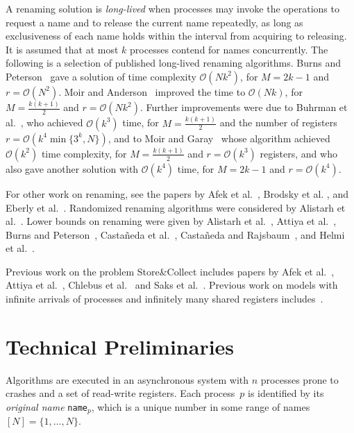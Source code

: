 \documentclass[11pt]{article}
\newcommand{\cO}{\mathcal{O}}
\begin{document}
A  renaming solution is \emph{long-lived} when processes may invoke the operations to request a name and to release the current name repeatedly, as long as exclusiveness of each name holds within the interval from acquiring to releasing.
It is assumed that at most $k$ processes contend for names concurrently.
The following is a selection of published long-lived renaming algorithms.
Burns and Peterson~\cite{BurnsP89} gave a solution of time complexity  $\cO(Nk^2)$, for $M=2k-1$ and $r=\cO(N^2)$.
Moir and Anderson~\cite{MoirA95}  improved the time to $\cO(Nk)$, for $M=\frac{k(k+1)}{2}$ and $r=\cO(Nk^2)$.
Further improvements were due to Buhrman et al.~\cite{BuhrmanGHM95}, who achieved $\cO(k^3)$ time, for $M=\frac{k(k+1)}{2}$ and the  number of registers $r=\cO(k^4\min\{3^k,N\})$, and to Moir and Garay~\cite{MoirG96} whose algorithm achieved $\cO(k^2)$ time complexity, for $M=\frac{k(k+1)}{2}$ and $r=\cO(k^3)$ registers, and who also gave another solution with $\cO(k^4)$ time, for $M=2k-1$ and $r=\cO(k^4)$.	

For other work on renaming, see the papers by Afek et al.~\cite{AfekAFST99,AfekBT00,AfekST02}, Brodsky et al. \cite{BrodskyEW06}, and Eberly et al.~\cite{EberlyHW98}.
Randomized renaming algorithms were considered by Alistarh et al.~\cite{AlistarhACGZ11, AlistarhAGW13, AlistarhAGGG10}.
Lower bounds on renaming were given by Alistarh et al.~\cite{AlistarhACGG14}, Attiya et al.~\cite{AttiyaCHP19,AttiyaP16,AttiyaR02}, Burns and Peterson~\cite{BurnsP89}, Casta\~neda et al.~\cite{CastanedaHR14}, Casta\~neda and Rajsbaum~\cite{CastanedaR10,CastanedaR12}, and Helmi et al.~\cite{HelmiHW14}.

Previous work on the problem Store\&Collect includes papers by Afek et al.~\cite{AfekST99}, Attiya et al.~\cite{AttiyaFK04,AttiyaF03,AttiyaFG02,AttiyaKPWW06}, Chlebus et al.~\cite{ChlebusKS-STOC04} and Saks et al.~\cite{SaksSW91}.
Previous work on models with infinite arrivals of processes and infinitely many shared registers includes~\cite{Aguilera04,AspnesSS02,ChocklerM05,GafniMT01,MerrittT03,MerrittT13}.





\section{Technical Preliminaries}

\label{sec:technical-preliminaries}


Algorithms are executed in an asynchronous system with $n$ processes prone to crashes and a set of read-write registers.
Each process~$p$ is identified by its \emph{original name} \texttt{name}$_p$, which is a unique number in some range of names $[N]=\{1,\ldots,N\}$.
\end{document}
